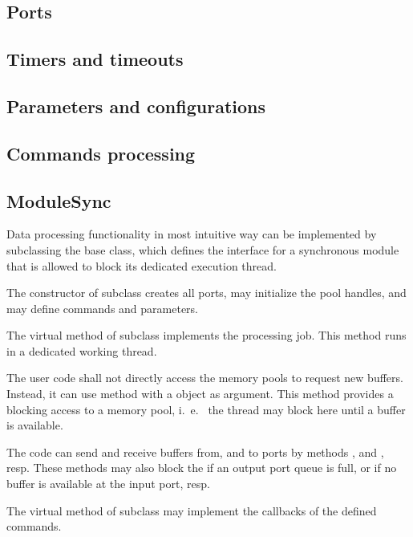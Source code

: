 \subsection{Ports}



\subsection{Timers and timeouts}


\subsection{Parameters and configurations}

\subsection{Commands processing}


\subsection{ModuleSync}
\label{plugin_module_sync}
Data processing functionality in most intuitive way can be implemented by subclassing 
the  base class, which defines the interface for a 
synchronous module that is allowed to block its dedicated execution thread.  
   
\begin{compactenum}
\item  The constructor of  subclass  creates all 
      ports, may initialize the pool handles, and may 
      define commands and parameters. 
\item  The virtual  method of  
      subclass implements the processing job. This method runs in a dedicated working thread.  
\item  The user code shall not directly access the 
      memory pools to request new buffers. Instead, it can use  method 
       with a  object as argument.
      This method provides a blocking access to a memory pool, i.~e.~ the  
      thread may block here until a buffer is available.
\item  The  code can send and receive buffers   
      from, and to ports by  methods , and
    , resp. These methods may also block the  if an output port queue is full, or if no buffer is available at the input port, resp.
\item  The virtual  method of  
      subclass may implement the callbacks of the defined commands.
\end{compactenum}

